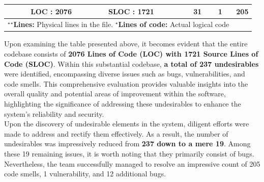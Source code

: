 \documentclass[12pt,letterpaper]{report}
\begin{document}
{\begin{table}[h!]
\begin{tabular}{|l|l|l|l|l|l|l|}
 &  & \textbf{LOC : 2076} &\textbf{SLOC : 1721} & \textbf{31} &\textbf{1} & \textbf{205}\\
\hline
\multicolumn{6}{c}{\footnotesize ${}^\star$${}^\star$\textbf{Lines:} Physical lines in the file. \hspace{1cm}  ${}^\star$\textbf{Lines of code:} Actual logical code}
\end{tabular}
\end{table}

Upon examining the table presented above, it becomes evident that the entire codebase consists of \textbf{2076 Lines of Code (LOC) with 1721 Source Lines of Code (SLOC)}. Within this substantial codebase, \textbf{a total of 237 undesirables} were identified, encompassing diverse issues such as bugs, vulnerabilities, and code smells. This comprehensive evaluation provides valuable insights into the overall quality and potential areas of improvement within the software, highlighting the significance of addressing these undesirables to enhance the system's reliability and security.\\

Upon the discovery of undesirable elements in the system, diligent efforts were made to address and rectify them effectively. As a result, the number of undesirables was impressively reduced from \textbf{237 down to a mere 19}. Among these 19 remaining issues, it is worth noting that they primarily consist of bugs. Nevertheless, the team successfully managed to resolve an impressive count of 205 code smells, 1 vulnerability, and 12 additional bugs.

}

\pagebreak
{}
\end{document}
